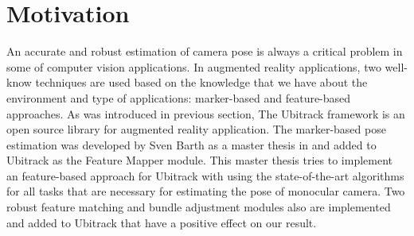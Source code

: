 \section{Motivation}
An accurate and robust estimation of camera pose is always a critical problem in some of computer vision applications. In augmented reality applications, two well-know techniques are used based on the knowledge that we have about the environment and type of applications: marker-based and feature-based approaches. As was introduced in previous section, The Ubitrack framework is an open source library for augmented reality application. The marker-based pose estimation was developed by Sven Barth as a master thesis in \cite{barth2014marker} and added to Ubitrack as the Feature Mapper module. This master thesis tries to implement an feature-based approach for Ubitrack with using the state-of-the-art algorithms for all tasks that are necessary for estimating the pose of monocular camera. Two robust feature matching and bundle adjustment modules also are implemented and added to Ubitrack that have a positive effect on our result.

